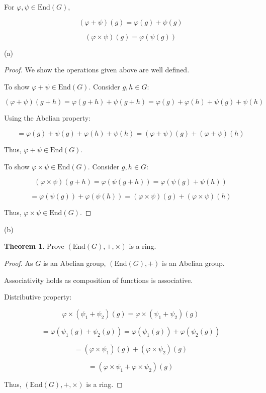 \documentclass[11pt]{article}
\theoremstyle{definition}
\newtheorem{theorem}{Theorem}[section]
\theoremstyle{remark}
\begin{document}
For $\varphi, \psi \in \text{End}(G)$,

\[
(\varphi + \psi)(g) = \varphi(g) + \psi(g)
\]

\[
(\varphi \times \psi)(g) = \varphi(\psi(g))
\]

(a)

\begin{proof}
We show the operations given above are well defined.

To show $\varphi + \psi \in \text{End}(G)$. Consider $g, h \in G$:

\[
(\varphi + \psi)(g + h) = \varphi(g + h) + \psi(g + h) = \varphi(g) + \varphi(h) + \psi(g) + \psi(h)
\]

Using the Abelian property:

\[
= \varphi(g) + \psi(g) + \varphi(h) + \psi(h) = (\varphi + \psi)(g) + (\varphi + \psi)(h)
\]

Thus, $\varphi + \psi \in \text{End}(G)$.

To show $\varphi \times \psi \in \text{End}(G)$. Consider $g, h \in G$:

\[
(\varphi \times \psi)(g + h) = \varphi(\psi(g + h)) = \varphi(\psi(g) + \psi(h))
\]

\[
= \varphi(\psi(g)) + \varphi(\psi(h)) = (\varphi \times \psi)(g) + (\varphi \times \psi)(h)
\]

Thus, $\varphi \times \psi \in \text{End}(G)$.
\end{proof}

(b)

\begin{theorem}\label{thm:end_as_ring}
Prove $(\text{End}(G), +, \times)$ is a ring.
\end{theorem}

\begin{proof}
As $G$ is an Abelian group, $(\text{End}(G), +)$ is an Abelian group.

Associativity holds as composition of functions is associative.

Distributive property:

\[
\varphi \times (\psi_1 + \psi_2)(g) = \varphi \times (\psi_1 + \psi_2)(g)
\]

\[
= \varphi(\psi_1(g) + \psi_2(g)) = \varphi(\psi_1(g)) + \varphi(\psi_2(g))
\]

\[
= (\varphi \times \psi_1)(g) + (\varphi \times \psi_2)(g)
\]

\[
= (\varphi \times \psi_1 + \varphi \times \psi_2)(g)
\]

Thus, $(\text{End}(G), +, \times)$ is a ring.
\end{proof}
\end{document}
